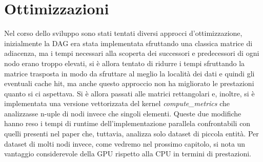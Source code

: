 \section{Ottimizzazioni}
Nel corso dello sviluppo sono stati tentati diversi approcci d'ottimizzazione, inizialmente la DAG era stata implementata sfruttando una classica matrice di adiacenza, ma i tempi necessari alla scoperta dei successori e predecessori di ogni nodo erano troppo elevati, si è allora tentato di ridurre i tempi sfruttando la matrice trasposta in modo da sfruttare al meglio la località dei dati e quindi gli eventuali cache hit, ma anche questo approccio non ha migliorato le prestazioni quanto si ci aspettava.
Si è allora passati alle matrici rettangolari e, inoltre, si è implementata una versione vettorizzata del kernel \textit{compute\_metrics} che analizzasse n-uple di nodi invece che singoli elementi.
Queste due modifiche hanno reso i tempi di runtime dell'implementazione parallela confrontabili con quelli presenti nel paper\cite{ilavarasan2007low} che, tuttavia, analizza solo dataset di piccola entità.
Per dataset di molti nodi invece, come vedremo nel prossimo capitolo, si nota un vantaggio considerevole della GPU rispetto alla CPU in termini di prestazioni.

\newpage

